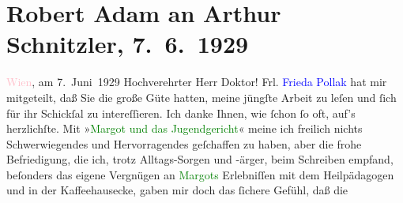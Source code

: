 

               \section[Robert Adam an Arthur Schnitzler, 7. 6. 1929]{ Robert Adam an Arthur Schnitzler, 7. 6. 1929}\nopagebreak{}\rehead{ }\normalsize\beginnumbering{} \toendnotes[C]{\smallbreak\pagebreak[2]} 
\toendnotes[C]{\smallbreak}\pstart
           \raggedleft{}{\pb}\textcolor{pink}{Wien}{}\ledrightnote{\textcolor{pink}{Wien}}, am 7. Juni 1929\pend
           \pstart{}Hochverehrter Herr Doktor!\pend\pstart
           Frl. \textcolor{blue}{Frieda Pollak}{}\ledrightnote{\textcolor{blue}{Frieda Pollak}} hat mir mitgeteilt, daß Sie
               die große Güte hatten, meine jüngſte Arbeit zu leſen und ſich für ihr Schickſal zu
               intereſſieren. Ich danke Ihnen, wie ſchon ſo oft, auf’s herzlichſte. Mit »\textcolor{green}{Margot und das Jugendgericht}{}\ledrightnote{\textcolor{green}{Margot und das Jugendgericht}}« meine ich freilich
               nichts Schwerwiegendes und Hervorragendes geſchaffen zu haben, aber die frohe
               Befriedigung, die ich, trotz Alltags-Sorgen und -ärger, beim Schreiben {\pb}empfand, beſonders das eigene Vergnügen an
                  \textcolor{green}{Margots}{} Erlebniſſen mit dem
               Heilpädagogen und in der Kaffeehausecke, gaben mir doch das ſichere Gefühl, daß die
